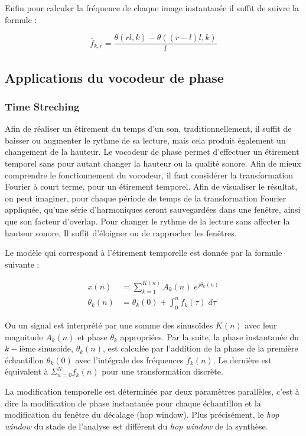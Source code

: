 Enfin pour calculer la fréquence de chaque image instantanée il suffit de suivre la formule :

\begin{equation}
    \bar{f}_{k,r} = \frac{\theta(rl,k) - \theta((r - l )l,k)}{l}
\end{equation}

\subsection{Applications du vocodeur de phase} 

    \subsubsection{Time Streching}

Afin de réaliser un étirement du temps d'un son, traditionnellement, il suffit de baisser ou augmenter le rythme de sa lecture, mais cela produit également un changement de la hauteur. Le vocodeur de phase permet d'effectuer un étirement temporel sans pour autant changer la hauteur ou la qualité sonore. Afin de mieux comprendre le fonctionnement du vocodeur, il faut considérer la transformation Fourier à court terme, pour un étirement temporel. Afin de visualiser le résultat, on peut imaginer, pour chaque période de temps de la transformation Fourier appliquée, qu'une série d'harmoniques seront sauvegardées dans une fenêtre, ainsi que son facteur d'overlap. Pour changer le rythme de la lecture sans affecter la hauteur sonore, Il suffit d'éloigner ou de rapprocher les fenêtres.

Le modèle qui correspond à l'étirement temporelle est donnée par la formule suivante :

    \begin{align}
         x(n) &= \sum_{k=1}^{K(n)} A_k(n) \; e^{j \theta_k (n)} \\
         \theta_k(n) &= \theta_k(0) + \int_{0}^{n} f_k (\tau) \; d\tau
    \end{align}

Ou un signal est interprété par une somme des sinusoïdes $K(n)$ avec leur magnitude $A_k(n)$ et phase $\theta_k$ appropriées. Par la suite, la phase instantanée du $k-$ième sinusoide, $\theta_k(n)$, est calculée par l'addition de la phase de la première échantillon $\theta_k(0)$ avec l'intégrale des fréquences $f_k (n)$. Le dernière est équivalent à $\Sigma_{n=0}^N f_k(n)$ pour une transformation discrète.

La modification temporelle est déterminée par deux paramètres parallèles, c’est à dire la modification de phase instantanée pour chaque échantillon et la modification du fenêtre du décalage (hop window). Plus précisément, le \textit{hop window} du stade de l'analyse est différent du \textit{hop window} de la synthèse.

